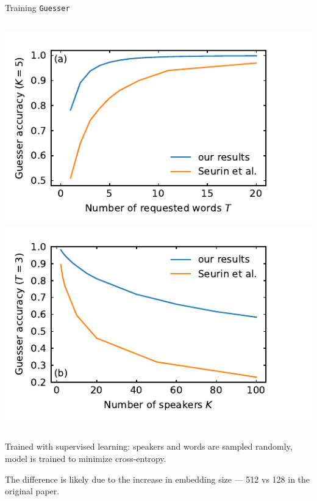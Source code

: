 \documentclass[11pt, aspectratio=169]{beamer}
\newcommand{\guesser}{\texttt{Guesser}}
\newcommand{\vimgscale}{0.8}
\begin{document}
\begin{frame}[t]{Training \guesser{}}
    \begin{columns}
        \centering
        \includegraphics[scale=\vimgscale]{../plots/word_sweep.pdf}
        \includegraphics[scale=\vimgscale]{../plots/guest_sweep.pdf}
    \end{columns}

    Trained with supervised learning: speakers and words are sampled randomly,
    model is trained to minimize cross-entropy.

    The difference is likely due to the increase in embedding size --- 512 vs
    128 in the original paper.
\end{frame}
\end{document}
